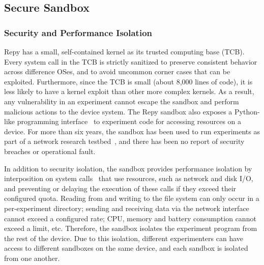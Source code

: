 \subsection{Secure Sandbox}\label{sec-repy-ext}

\subsubsection{Security and Performance Isolation}

Repy has a small, self-contained kernel as its trusted 
computing base (TCB). %
Every system call in the TCB is strictly 
sanitized to preserve consistent behavior across difference OSes, 
and to avoid uncommon corner cases that can be exploited. 
Furthermore, since the TCB is small (about 8,000 lines of code), it is 
less likely to have a kernel exploit than other more complex kernels. 
As a result, any vulnerability in an experiment 
cannot escape the sandbox and perform malicious actions to 
the device system. The Repy sandbox also exposes a Python-like 
programming interface~\cite{repyv2} to experiment code 
for accessing resources on a device. 
For more than six years, the
sandbox has been used to run experiments as part of a network research 
testbed~\cite{seattle}, and there has been no report of security 
breaches or operational fault. 

In addition to security isolation,
the sandbox provides performance isolation by
interposition on system calls~\cite{garfinkel2003traps} that 
use resources, such as network and disk I/O, and preventing 
or delaying the execution of these calls if they exceed 
their configured quota. 
Reading from and writing to the file system can
only occur in a per-experiment directory; sending and receiving
data via the network interface cannot exceed a configured rate;
CPU, memory and battery consumption cannot exceed a limit, etc.
Therefore, the sandbox isolates the experiment program from 
the rest of the device. Due to this isolation, different experimenters
can have access to different sandboxes on the same device,
and each sandbox is isolated from one another.

